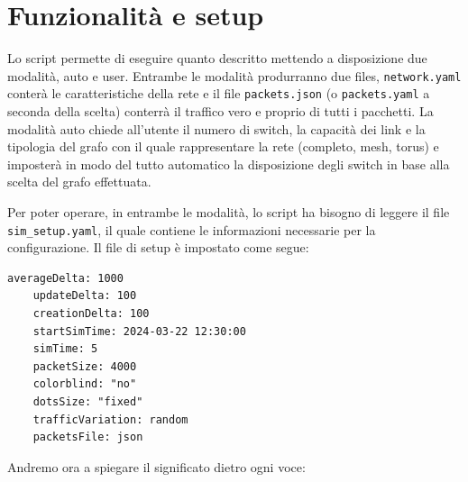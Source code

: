 \documentclass[binding=0.6cm]{sapthesis}
\begin{document}
\section{Funzionalità e setup} 
Lo script permette di eseguire quanto descritto mettendo a
 disposizione due modalità, auto e user. Entrambe le modalità produrranno due files, 
 \texttt{network.yaml} conterà le caratteristiche della rete e il file \texttt{packets.json} (o \texttt{packets.yaml}
 a seconda della scelta) conterrà il traffico vero e proprio di tutti i pacchetti. La modalità auto chiede all'utente il numero di switch, la capacità dei
  link e la tipologia del grafo con il quale rappresentare la rete (completo, mesh, torus) e
   imposterà in modo del tutto automatico
   la disposizione degli switch in base alla scelta del grafo effettuata. 

   Per poter operare,
    in entrambe le modalità, lo script ha bisogno di leggere il file \texttt{sim\_setup.yaml}, il quale contiene le informazioni necessarie per la configurazione. 
    Il file di setup è impostato come segue:
{\scriptsize %
\begin{lstlisting}[caption={Esempio di setup file}, label={codice:sim_setup_example}]
    averageDelta: 1000
    updateDelta: 100
    creationDelta: 100
    startSimTime: 2024-03-22 12:30:00
    simTime: 5
    packetSize: 4000
    colorblind: "no"
    dotsSize: "fixed"
    trafficVariation: random
    packetsFile: json
\end{lstlisting}
}
Andremo ora a spiegare il significato dietro ogni voce:
\end{document}

